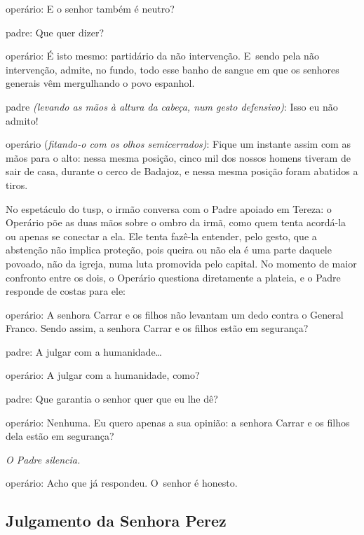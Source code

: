 \startblockquote
{\sc operário}: E o senhor também é neutro?

{\sc padre}: Que quer dizer?

{\sc operário}: É isto mesmo: partidário da não intervenção. E~sendo pela
não intervenção, admite, no fundo, todo esse banho de sangue em que os
senhores generais vêm mergulhando o povo espanhol.

{\sc padre} {\it (levando as mãos à altura da cabeça, num gesto defensivo)}:
Isso eu não admito!

{\sc operário} ({\it fitando-o com os olhos semicerrados)}: Fique um instante
assim com as mãos para o alto: nessa mesma posição, cinco mil dos nossos
homens tiveram de sair de casa, durante o cerco de Badajoz, e nessa
mesma posição foram abatidos a tiros.
\stopblockquote

No espetáculo do {\sc tusp}, o irmão conversa com o Padre apoiado em Tereza: o
Operário põe as duas mãos sobre o ombro da irmã, como quem tenta
acordá-la ou apenas se conectar a ela. Ele tenta fazê-la entender, pelo
gesto, que a abstenção não implica proteção, pois queira ou não ela é
uma parte daquele povoado, não da igreja, numa luta promovida pelo
capital. No momento de maior confronto entre os dois, o Operário
questiona diretamente a plateia, e o Padre responde de costas para ele:

\startblockquote
{\sc operário}: A senhora Carrar e os filhos não levantam um dedo contra o
General Franco. Sendo assim, a senhora Carrar e os filhos estão em
segurança?

{\sc padre}: A julgar com a humanidade\ldots{}

{\sc operário}: A julgar com a humanidade, como?

{\sc padre}: Que garantia o senhor quer que eu lhe dê?

{\sc operário}: Nenhuma. Eu quero apenas a sua opinião: a senhora Carrar e os
filhos dela estão em segurança?

{\it O Padre silencia.}

{\sc operário}: Acho que já respondeu. O~senhor é honesto.
\stopblockquote


\subsection{Julgamento da Senhora Perez}

